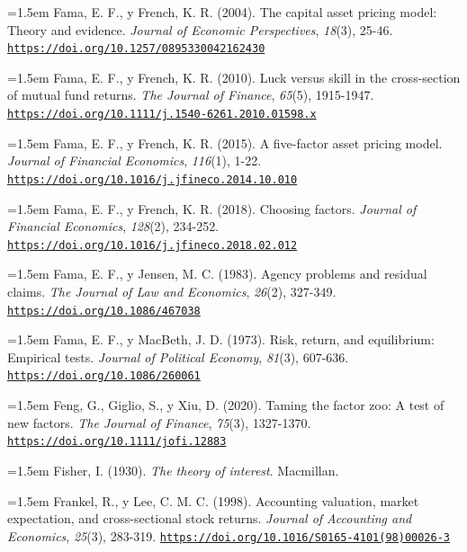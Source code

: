 \documentclass[10pt,a4paper]{article}
\begin{document}
\noindent\hangindent=1.5em Fama, E. F., y French, K. R. (2004). The capital asset pricing model: Theory and evidence. \textit{Journal of Economic Perspectives}, \textit{18}(3), 25-46. \href{https://doi.org/10.1257/0895330042162430}{\nolinkurl{https://doi.org/10.1257/0895330042162430}}

\noindent\hangindent=1.5em Fama, E. F., y French, K. R. (2010). Luck versus skill in the cross-section of mutual fund returns. \textit{The Journal of Finance}, \textit{65}(5), 1915-1947. \href{https://doi.org/10.1111/j.1540-6261.2010.01598.x}{\nolinkurl{https://doi.org/10.1111/j.1540-6261.2010.01598.x}}

\noindent\hangindent=1.5em Fama, E. F., y French, K. R. (2015). A five-factor asset pricing model. \textit{Journal of Financial Economics}, \textit{116}(1), 1-22. \href{https://doi.org/10.1016/j.jfineco.2014.10.010}{\nolinkurl{https://doi.org/10.1016/j.jfineco.2014.10.010}}

\noindent\hangindent=1.5em Fama, E. F., y French, K. R. (2018). Choosing factors. \textit{Journal of Financial Economics}, \textit{128}(2), 234-252. \href{https://doi.org/10.1016/j.jfineco.2018.02.012}{\nolinkurl{https://doi.org/10.1016/j.jfineco.2018.02.012}}

\noindent\hangindent=1.5em Fama, E. F., y Jensen, M. C. (1983). Agency problems and residual claims. \textit{The Journal of Law and Economics}, \textit{26}(2), 327-349. \href{https://doi.org/10.1086/467038}{\nolinkurl{https://doi.org/10.1086/467038}}

\noindent\hangindent=1.5em Fama, E. F., y MacBeth, J. D. (1973). Risk, return, and equilibrium: Empirical tests. \textit{Journal of Political Economy}, \textit{81}(3), 607-636. \href{https://doi.org/10.1086/260061}{\nolinkurl{https://doi.org/10.1086/260061}}

\noindent\hangindent=1.5em Feng, G., Giglio, S., y Xiu, D. (2020). Taming the factor zoo: A test of new factors. \textit{The Journal of Finance}, \textit{75}(3), 1327-1370. \href{https://doi.org/10.1111/jofi.12883}{\nolinkurl{https://doi.org/10.1111/jofi.12883}}

\noindent\hangindent=1.5em Fisher, I. (1930). \textit{The theory of interest}. Macmillan.

\noindent\hangindent=1.5em Frankel, R., y Lee, C. M. C. (1998). Accounting valuation, market expectation, and cross-sectional stock returns. \textit{Journal of Accounting and Economics}, \textit{25}(3), 283-319. \href{https://doi.org/10.1016/S0165-4101(98)00026-3}{\nolinkurl{https://doi.org/10.1016/S0165-4101(98)00026-3}}
\end{document}
